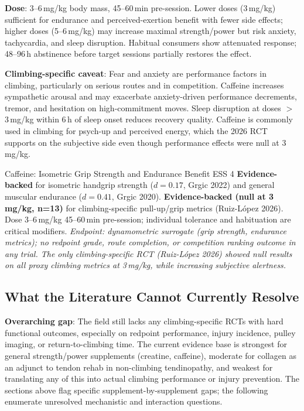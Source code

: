 \textbf{Dose}: 3--6\,mg/kg body mass, 45--60\,min pre-session. Lower doses (3\,mg/kg) sufficient for endurance and perceived-exertion benefit with fewer side effects; higher doses (5--6\,mg/kg) may increase maximal strength/power but risk anxiety, tachycardia, and sleep disruption. Habitual consumers show attenuated response; 48--96\,h abstinence before target sessions partially restores the effect.

\textbf{Climbing-specific caveat}: Fear and anxiety are performance factors in climbing, particularly on serious routes and in competition. Caffeine increases sympathetic arousal and may exacerbate anxiety-driven performance decrements, tremor, and hesitation on high-commitment moves. Sleep disruption at doses $>$3\,mg/kg within 6\,h of sleep onset reduces recovery quality. Caffeine is commonly used in climbing for psych-up and perceived energy, which the 2026 RCT supports on the subjective side even though performance effects were null at 3\,mg/kg.

\begin{evidencebox}{Caffeine: Isometric Grip Strength and Endurance Benefit \cdot \evidencebacked \cdot ESS 4}
\textbf{Evidence-backed} for isometric handgrip strength ($d{=}0.17$, Grgic 2022) and general muscular endurance ($d{=}0.41$, Grgic 2020). \textbf{Evidence-backed (null at 3\,mg/kg, n=13)} for climbing-specific pull-up/grip metrics (Ruiz-L\'opez 2026). Dose 3--6\,mg/kg 45--60\,min pre-session; individual tolerance and habituation are critical modifiers. \textit{Endpoint: dynamometric surrogate (grip strength, endurance metrics); no redpoint grade, route completion, or competition ranking outcome in any trial. The only climbing-specific RCT (Ruiz-L\'opez 2026) showed null results on all proxy climbing metrics at 3\,mg/kg, while increasing subjective alertness.}
\end{evidencebox}

\subsection{What the Literature Cannot Currently Resolve}
\label{subsec:suppgaps}

\textbf{Overarching gap}: The field still lacks any climbing-specific RCTs with hard functional outcomes, especially on redpoint performance, injury incidence, pulley imaging, or return-to-climbing time. The current evidence base is strongest for general strength/power supplements (creatine, caffeine), moderate for collagen as an adjunct to tendon rehab in non-climbing tendinopathy, and weakest for translating any of this into actual climbing performance or injury prevention. The sections above flag specific supplement-by-supplement gaps; the following enumerate unresolved mechanistic and interaction questions.

